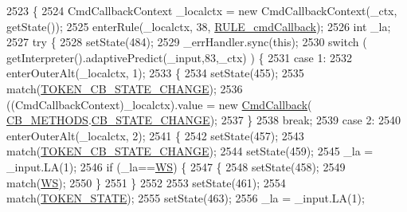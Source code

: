 \begin{DoxyCode}
2523                                                                             \{
2524     CmdCallbackContext \_localctx = \textcolor{keyword}{new} CmdCallbackContext(\_ctx, getState());
2525     enterRule(\_localctx, 38, \hyperlink{classgov_1_1nasa_1_1jpf_1_1inspector_1_1client_1_1parser_1_1_console_grammar_parser_a084430d36c0c1023870b5d273c2c71d3}{RULE\_cmdCallback});
2526     \textcolor{keywordtype}{int} \_la;
2527     \textcolor{keywordflow}{try} \{
2528       setState(484);
2529       \_errHandler.sync(\textcolor{keyword}{this});
2530       \textcolor{keywordflow}{switch} ( getInterpreter().adaptivePredict(\_input,83,\_ctx) ) \{
2531       \textcolor{keywordflow}{case} 1:
2532         enterOuterAlt(\_localctx, 1);
2533         \{
2534         setState(455);
2535         match(\hyperlink{classgov_1_1nasa_1_1jpf_1_1inspector_1_1client_1_1parser_1_1_console_grammar_parser_a1593d2143dd48d46c80826136b940538}{TOKEN\_CB\_STATE\_CHANGE});
2536          ((CmdCallbackContext)\_localctx).value =  \textcolor{keyword}{new} \hyperlink{classgov_1_1nasa_1_1jpf_1_1inspector_1_1client_1_1commands_1_1_cmd_callback}{CmdCallback}(
      \hyperlink{enumgov_1_1nasa_1_1jpf_1_1inspector_1_1interfaces_1_1_inspector_call_backs_1_1_c_b___m_e_t_h_o_d_s}{CB\_METHODS}.\hyperlink{enumgov_1_1nasa_1_1jpf_1_1inspector_1_1interfaces_1_1_inspector_call_backs_1_1_c_b___m_e_t_h_o_d_s_ab2ca56f350245242d19bdb6cbcd38032}{CB\_STATE\_CHANGE}); 
2537         \}
2538         \textcolor{keywordflow}{break};
2539       \textcolor{keywordflow}{case} 2:
2540         enterOuterAlt(\_localctx, 2);
2541         \{
2542         setState(457);
2543         match(\hyperlink{classgov_1_1nasa_1_1jpf_1_1inspector_1_1client_1_1parser_1_1_console_grammar_parser_a1593d2143dd48d46c80826136b940538}{TOKEN\_CB\_STATE\_CHANGE});
2544         setState(459);
2545         \_la = \_input.LA(1);
2546         \textcolor{keywordflow}{if} (\_la==\hyperlink{classgov_1_1nasa_1_1jpf_1_1inspector_1_1client_1_1parser_1_1_console_grammar_parser_a6914a3a3adbc350b12a7df9d1b24abf1}{WS}) \{
2547           \{
2548           setState(458);
2549           match(\hyperlink{classgov_1_1nasa_1_1jpf_1_1inspector_1_1client_1_1parser_1_1_console_grammar_parser_a6914a3a3adbc350b12a7df9d1b24abf1}{WS});
2550           \}
2551         \}
2552 
2553         setState(461);
2554         match(\hyperlink{classgov_1_1nasa_1_1jpf_1_1inspector_1_1client_1_1parser_1_1_console_grammar_parser_a1eb6e6861380a1b43846ff1627ecf06f}{TOKEN\_STATE});
2555         setState(463);
2556         \_la = \_input.LA(1);

\end{DoxyCode}
